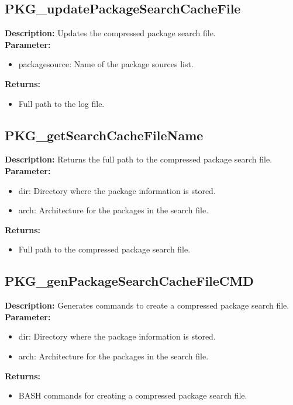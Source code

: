 \subsection{PKG\_updatePackageSearchCacheFile}
\textbf{Description:} Updates the compressed package search file.\\
\textbf{Parameter:}
\begin{itemize}
\item packagesource: Name of the package sources list.
\end{itemize}
\textbf{Returns:}
\begin{itemize}
\item Full path to the log file.
\end{itemize}

\subsection{PKG\_getSearchCacheFileName}
\textbf{Description:} Returns the full path to the compressed package search file.\\
\textbf{Parameter:}
\begin{itemize}
\item dir: Directory where the package information is stored.
\item arch: Architecture for the packages in the search file.
\end{itemize}
\textbf{Returns:}
\begin{itemize}
\item Full path to the compressed package search file.
\end{itemize}

\subsection{PKG\_genPackageSearchCacheFileCMD}
\textbf{Description:} Generates commands to create a compressed package search file.\\
\textbf{Parameter:}
\begin{itemize}
\item dir: Directory where the package information is stored.
\item arch: Architecture for the packages in the search file.
\end{itemize}
\textbf{Returns:}
\begin{itemize}
\item BASH commands for creating a compressed package search file.
\end{itemize}

